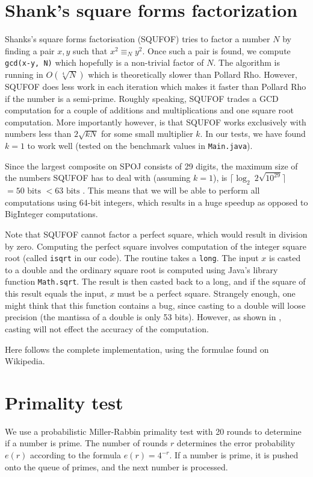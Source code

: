\documentclass{article}
\begin{document}


\section{Shank's square forms factorization}
\label{squfof}
Shanks's square forms factorisation (SQUFOF) tries to factor a number $N$ by finding a pair $x, y$ such that $x^2\equiv_N y^2$. Once such a pair is found, we compute \verb!gcd(x-y, N)! which hopefully is a non-trivial factor of $N$. The algorithm is running in $O(\sqrt[4]{N})$ which is theoretically slower than Pollard Rho. However, SQUFOF does less work in each iteration which makes it faster than Pollard Rho if the number is a semi-prime. Roughly speaking, SQUFOF trades a GCD computation for a couple of additions and multiplications and one square root computation. More importantly however, is that SQUFOF works exclusively with numbers less than $2\sqrt{kN}$ for some small multiplier $k$. In our tests, we have found $k=1$ to work well (tested on the benchmark values in \verb!Main.java!).

Since the largest composite on SPOJ consists of 29 digits, the maximum size of the numbers SQUFOF has to deal with (assuming $k=1$), is $\lceil \log_2\ 2\sqrt{10^{29}} \rceil$ $ = 50 \text{ bits } < 63 \text{ bits }$. This means that we will be able to perform all computations using 64-bit integers, which results in a huge speedup as opposed to BigInteger computations.

Note that SQUFOF cannot factor a perfect square, which would result in division by zero. Computing the perfect square involves computation of the integer square root (called \verb!isqrt! in our code). The routine takes a \verb!long!. The input $x$ is casted to a double and the ordinary square root is computed using Java's library function \verb!Math.sqrt!. The result is then casted back to a long, and if the square of this result equals the input, $x$ must be a perfect square. Strangely enough, one might think that this function contains a bug, since casting to a double will loose precision (the mantissa of a double is only 53 bits). However, as shown in \cite{237865}, casting will not effect the accuracy of the computation.

Here follows the complete implementation, using the formulae found on Wikipedia\cite{wiki_shanks}.


\section{Primality test}
\label{primetest}
We use a probabilistic Miller-Rabbin primality test with 20 rounds to determine if a number is prime. The number of rounds $r$ determines the error probability $e(r)$ according to the formula $e(r)=4^{-r}$. If a number is prime, it is pushed onto the queue of primes, and the next number is processed.
\end{document}
